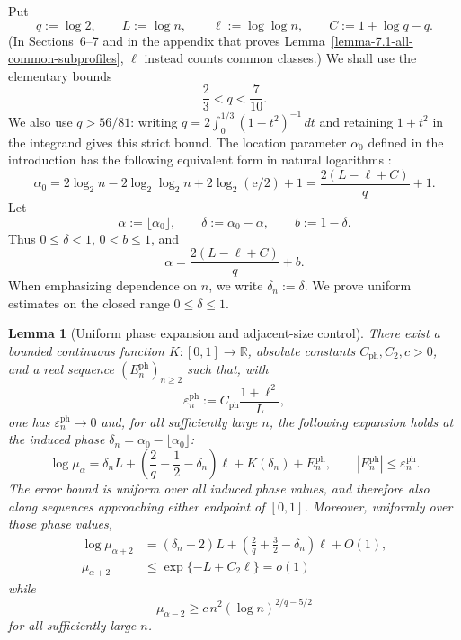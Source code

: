 \documentclass[a4paper,10pt,reqno]{amsart}
\numberwithin{equation}{section}
\theoremstyle{plain}
\newtheorem{lemma}[theorem]{Lemma}
\theoremstyle{remark}
\begin{document}
Put
\[
  q:=\log 2,
  \qquad L:=\log n,
  \qquad \ell:=\log\log n,
  \qquad C:=1+\log q-q.
\]
(In Sections~6--7 and in the appendix that proves
Lemma~\ref{lemma-7.1-all-common-subprofiles}, $\ell$ instead counts common
classes.)
We shall use the elementary bounds
\begin{equation}
 \frac23<q<\frac7{10}.
 \tag{2.0}
\end{equation}
We also use $q>56/81$: writing
$q=2\int_0^{1/3}(1-t^2)^{-1}\,dt$ and retaining $1+t^2$ in the integrand
gives this strict bound.
The location parameter $\alpha_0$ defined in the introduction has the
following equivalent form in natural logarithms
\citep[Section~2.1]{heckel-2025-difference}:
\begin{equation*}
  \alpha_0
  =2\log_2 n-2\log_2\log_2 n+2\log_2(\mathrm e/2)+1
  =\frac{2(L-\ell+C)}q+1.
  \tag{2.1}
\end{equation*}
Let
\[
  \alpha:=\lfloor\alpha_0\rfloor,
  \qquad
  \delta:=\alpha_0-\alpha,
  \qquad
  b:=1-\delta.
\]
Thus $0\le\delta<1$, $0<b\le1$, and
\[
  \alpha=\frac{2(L-\ell+C)}q+b.
\]
When emphasizing dependence on $n$, we write $\delta_n:=\delta$.
We prove uniform estimates on the closed range $0\le\delta\le1$.

\begin{lemma}[Uniform phase expansion and adjacent-size control]
\label{lem:phase-expansion}
There exist a bounded continuous function $K\colon[0,1]\to\mathbb R$,
absolute constants $C_{\mathrm{ph}},C_2,c>0$, and a real sequence
$(E_n^{\mathrm{ph}})_{n\ge2}$ such that, with
\[
  \varepsilon_n^{\mathrm{ph}}
  :=C_{\mathrm{ph}}\frac{1+\ell^2}{L},
\]
one has $\varepsilon_n^{\mathrm{ph}}\to0$ and, for all sufficiently large
$n$, the following expansion holds at the induced phase
$\delta_n=\alpha_0-\lfloor\alpha_0\rfloor$:
\begin{equation*}
  \log\mu_\alpha
  =
  \delta_n L
  +\left(\frac2q-\frac12-\delta_n\right)\ell
  +K(\delta_n)
  +E_n^{\mathrm{ph}},
  \qquad
  |E_n^{\mathrm{ph}}|\le\varepsilon_n^{\mathrm{ph}}.
  \tag{2.2}
\end{equation*}
The error bound is uniform over all induced phase values, and therefore also
along sequences approaching either endpoint of $[0,1]$. Moreover, uniformly
over those phase values,
\begin{equation*}
\begin{split}
  \log\mu_{\alpha+2}
  &=(\delta_n-2)L
    +\left(\frac2q+\frac32-\delta_n\right)\ell+O(1),\\
  \mu_{\alpha+2}
  &\le \exp\{-L+C_2\ell\}=o(1)
\end{split}
  \tag{2.3}
\end{equation*}
while
\begin{equation*}
  \mu_{\alpha-2}
  \ge c\,n^2(\log n)^{2/q-5/2}
  \tag{2.4}
\end{equation*}
for all sufficiently large $n$.
\end{lemma}
\end{document}
